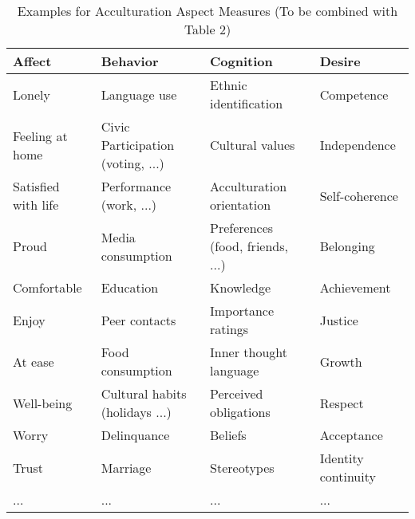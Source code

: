 \begin{table}[hbt!]
\caption{Examples for Acculturation Aspect Measures (To be combined with Table 2)}
\label{tab:ExamplesTab} 
\begin{tabular}{@{}llll@{}}
\toprule
Affect              & Behavior                                     & Cognition                          & Desire                \\ \midrule
Lonely              & Language   use                               & Ethnic   identification            & Competence            \\
Feeling at home     & Civic   Participation (voting, ...)          & Cultural   values                  & Independence          \\
Satisfied with life & Performance   (work, ...)                    & Acculturation   orientation        & Self-coherence        \\
Proud               & Media   consumption                          & Preferences   (food, friends, ...) & Belonging             \\
Comfortable         & Education                                    & Knowledge                          & Achievement           \\
Enjoy               & Peer   contacts                              & Importance   ratings               & Justice               \\
At ease             & Food   consumption                           & Inner   thought language           & Growth                \\
Well-being          & Cultural   habits (holidays ...) & Perceived   obligations            & Respect               \\
Worry               & Delinquance                                  & Beliefs                            & Acceptance            \\
Trust               & Marriage                                     & Stereotypes                        & Identity   continuity \\
...                 & ...                                          & ...                                & ...                   \\ \bottomrule
\end{tabular}
\end{table}